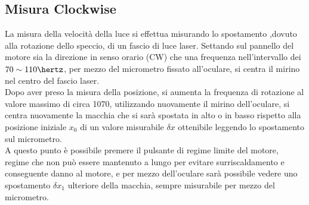 \subsection{Misura Clockwise}
La misura della velocità della luce si effettua misurando lo spostamento ,dovuto alla rotazione dello speccio, di un fascio di luce laser.
Settando sul pannello del motore sia la direzione in senso orario (CW) che una frequenza nell'intervallo dei $70\sim 110\hertz$, per mezzo del micrometro fissato all'oculare, si centra il mirino nel centro del fascio laser.\\
Dopo aver preso la misura della posizione, si aumenta la frequenza di rotazione al valore massimo di circa 1070\hertz, utilizzando nuovamente il mirino dell'oculare, si centra nuovamente la macchia che si sarà spostata in alto o in basso rispetto alla posizione iniziale $x_0$ di un valore misurabile $\delta x$ ottenibile leggendo lo spostamento sul micrometro.\\
A questo punto è possibile premere il pulsante di regime limite del motore, regime che non può essere mantenuto a lungo per evitare surriscaldamento e conseguente danno al motore, e per mezzo dell'oculare sarà possibile vedere uno spostamento $\delta x_1$ ulteriore della macchia, sempre misurabile per mezzo del micrometro.
